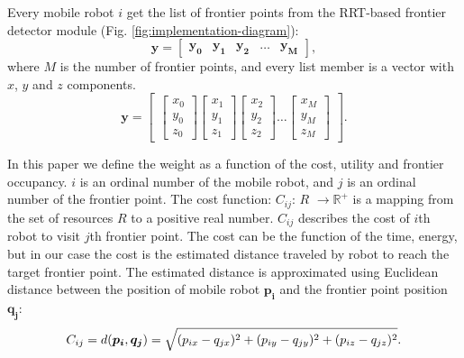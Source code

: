 \documentclass[letterpaper, 10 pt, conference]{ieeeconf}  %
\begin{document}
Every mobile robot $i$ get the list of frontier points from the RRT-based frontier detector module (Fig. \ref{fig:implementation-diagram}): 
\begin{equation}
   \boldsymbol{y}=\begin{bmatrix}
    \boldsymbol{y_{0}} & \boldsymbol{y_{1}} & \boldsymbol{y_{2}} & \hdots & \boldsymbol{y_{M}}
\end{bmatrix},
\end{equation}
where $M$ is  the number of frontier points, and every list member is a vector with $x$, $y$ and $z$ components. 
\begin{equation}
   \boldsymbol{y}=\begin{bmatrix}
   \begin{bmatrix}
           x_{0} \\
           y_{0} \\
           z_{0}
   \end{bmatrix}
    \begin{bmatrix}
         x_{1} \\
         y_{1} \\
         z_{1}
    \end{bmatrix}
    \begin{bmatrix}
         x_{2} \\
         y_{2} \\
         z_{2}
    \end{bmatrix}
    \hdots
    \begin{bmatrix}
         x_{M} \\
         y_{M} \\
         z_{M}
    \end{bmatrix}
\end{bmatrix}.
\end{equation}

In this paper we define the weight as a function of the cost, utility and frontier occupancy.  $i$ is an ordinal number of the mobile robot, and $j$ is an ordinal number of the frontier point. The cost function: $C_{ij}$: $R$ \(\rightarrow \text{$\mathbb{R}^{+}$}\) is a mapping from the set of resources $R$ to a positive real number. $C_{ij}$ describes the cost of $i$th robot to visit $j$th frontier point. The cost can be the function of the time, energy, but in our case the cost is the estimated distance traveled by robot to reach the target frontier point. The estimated distance is approximated using Euclidean distance between the position of mobile robot $\boldsymbol{p_{i}}$ and the frontier point position $\boldsymbol{q_{j}}$:
\begin{equation}\small
    C_{ij}=d(\boldsymbol{p_{i}}, \boldsymbol{q_{j}}) = \sqrt{(p_{ix}-q_{jx})^{2}+(p_{iy}-q_{jy})^{2}+(p_{iz}-q_{jz})^{2}}.
    \label{cost}
\end{equation}
\end{document}
